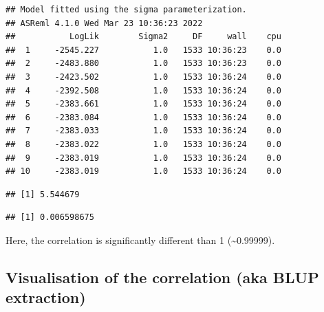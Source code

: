 \documentclass[
  12pt,
]{book}
\newenvironment{Shaded}{\begin{snugshade}}{\end{snugshade}}
\newcommand{\DataTypeTok}[1]{\textcolor[rgb]{0.13,0.29,0.53}{#1}}
\newcommand{\DecValTok}[1]{\textcolor[rgb]{0.00,0.00,0.81}{#1}}
\newcommand{\FloatTok}[1]{\textcolor[rgb]{0.00,0.00,0.81}{#1}}
\newcommand{\KeywordTok}[1]{\textcolor[rgb]{0.13,0.29,0.53}{\textbf{#1}}}
\newcommand{\NormalTok}[1]{#1}
\newcommand{\OperatorTok}[1]{\textcolor[rgb]{0.81,0.36,0.00}{\textbf{#1}}}
\newcommand{\StringTok}[1]{\textcolor[rgb]{0.31,0.60,0.02}{#1}}
\begin{document}
\begin{verbatim}
## Model fitted using the sigma parameterization.
## ASReml 4.1.0 Wed Mar 23 10:36:23 2022
##           LogLik        Sigma2     DF     wall    cpu
##  1     -2545.227           1.0   1533 10:36:23    0.0
##  2     -2483.880           1.0   1533 10:36:23    0.0
##  3     -2423.502           1.0   1533 10:36:24    0.0
##  4     -2392.508           1.0   1533 10:36:24    0.0
##  5     -2383.661           1.0   1533 10:36:24    0.0
##  6     -2383.084           1.0   1533 10:36:24    0.0
##  7     -2383.033           1.0   1533 10:36:24    0.0
##  8     -2383.022           1.0   1533 10:36:24    0.0
##  9     -2383.019           1.0   1533 10:36:24    0.0
## 10     -2383.019           1.0   1533 10:36:24    0.0
\end{verbatim}

\begin{Shaded}
\end{Shaded}

\begin{verbatim}
## [1] 5.544679
\end{verbatim}

\begin{Shaded}
\end{Shaded}

\begin{verbatim}
## [1] 0.006598675
\end{verbatim}

Here, the correlation is significantly different than 1 (\textasciitilde0.99999).

\hypertarget{visualisation-of-the-correlation-aka-blup-extraction}{%
\subsection{Visualisation of the correlation (aka BLUP extraction)}\label{visualisation-of-the-correlation-aka-blup-extraction}}
\end{document}

